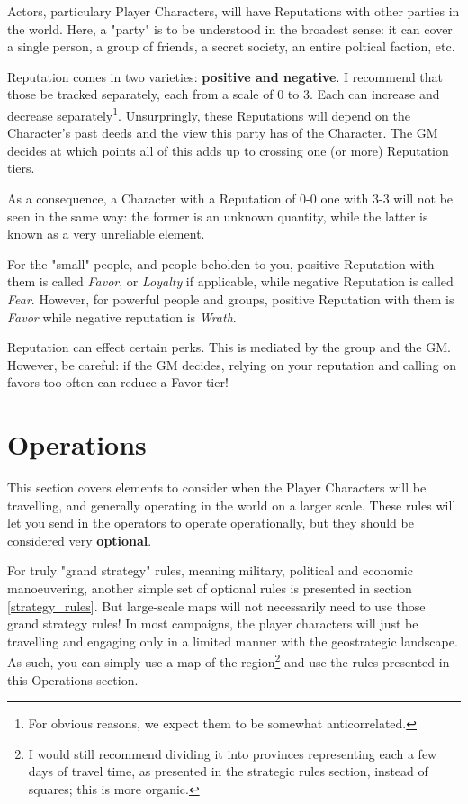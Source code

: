 \label{reputations}

Actors, particulary Player Characters, will have Reputations with other parties in the world. Here, a "party" is to be understood in the broadest sense: it can cover a single person, a group of friends, a secret society, an entire poltical faction, etc.

Reputation comes in two varieties: \textbf{positive and negative}. I recommend that those be tracked separately, each from a scale of 0 to 3. Each can increase and decrease separately\footnote{For obvious reasons, we expect them to be somewhat anticorrelated.}. Unsurpringly, these Reputations will depend on the Character's past deeds and the view this party has of the Character. The GM decides at which points all of this adds up to crossing one (or more) Reputation tiers.

As a consequence, a Character with a Reputation of 0-0 one with 3-3 will not be seen in the same way: the former is an unknown quantity, while the latter is known as a very unreliable element.

For the "small" people, and people beholden to you, positive Reputation with them is called \textit{Favor}, or \textit{Loyalty} if applicable, while negative Reputation is called \textit{Fear}. However, for powerful people and groups, positive Reputation with them is \textit{Favor} while negative reputation is \textit{Wrath}.

Reputation can effect certain perks. This is mediated by the group and the GM. However, be careful: if the GM decides, relying on your reputation and calling on favors too often can reduce a Favor tier!



\section{Operations}
\label{operations}

This section covers elements to consider when the Player Characters will be travelling, and generally operating in the world on a larger scale. These rules will let you send in the operators to operate operationally, but they should be considered very \textbf{optional}.

For truly "grand strategy" rules, meaning military, political and economic manoeuvering, another simple set of optional rules is presented in section \ref{strategy_rules}. But large-scale maps will not necessarily need to use those grand strategy rules! In most campaigns, the player characters will just be travelling and engaging only in a limited manner with the geostrategic landscape. As such, you can simply use a map of the region\footnote{I would still recommend dividing it into provinces representing each a few days of travel time, as presented in the strategic rules section, instead of squares; this is more organic.} and use the rules presented in this Operations section.

